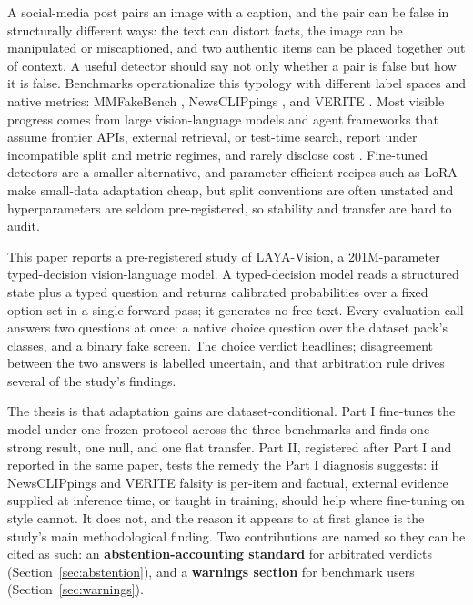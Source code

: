 \documentclass[conference]{IEEEtran}
\begin{document}
A social-media post pairs an image with a caption, and the pair can be false in structurally different ways: the text can distort facts, the image can be manipulated or miscaptioned, and two authentic items can be placed together out of context. A useful detector should say not only whether a pair is false but how it is false. Benchmarks operationalize this typology with different label spaces and native metrics: MMFakeBench \cite{Liu2024MmfakebenchMixedsource}, NewsCLIPpings \cite{Luo2021NewsclippingsAutomatic}, and VERITE \cite{Papadopoulos2023VeriteRobust}. Most visible progress comes from large vision-language models and agent frameworks that assume frontier APIs, external retrieval, or test-time search, report under incompatible split and metric regimes, and rarely disclose cost \cite{Radford2021LearningTransferable,Qi2024SnifferMultimodal}. Fine-tuned detectors are a smaller alternative, and parameter-efficient recipes such as LoRA \cite{Hu2021LoraLowrank} make small-data adaptation cheap, but split conventions are often unstated and hyperparameters are seldom pre-registered, so stability and transfer are hard to audit.

This paper reports a pre-registered study of LAYA-Vision, a 201M-parameter typed-decision vision-language model. A typed-decision model reads a structured state plus a typed question and returns calibrated probabilities over a fixed option set in a single forward pass; it generates no free text. Every evaluation call answers two questions at once: a native choice question over the dataset pack's classes, and a binary fake screen. The choice verdict headlines; disagreement between the two answers is labelled uncertain, and that arbitration rule drives several of the study's findings.

The thesis is that adaptation gains are dataset-conditional. Part I fine-tunes the model under one frozen protocol across the three benchmarks and finds one strong result, one null, and one flat transfer. Part II, registered after Part I and reported in the same paper, tests the remedy the Part I diagnosis suggests: if NewsCLIPpings and VERITE falsity is per-item and factual, external evidence supplied at inference time, or taught in training, should help where fine-tuning on style cannot. It does not, and the reason it appears to at first glance is the study's main methodological finding. Two contributions are named so they can be cited as such: an \textbf{abstention-accounting standard} for arbitrated verdicts (Section~\ref{sec:abstention}), and a \textbf{warnings section} for benchmark users (Section~\ref{sec:warnings}).
\end{document}
